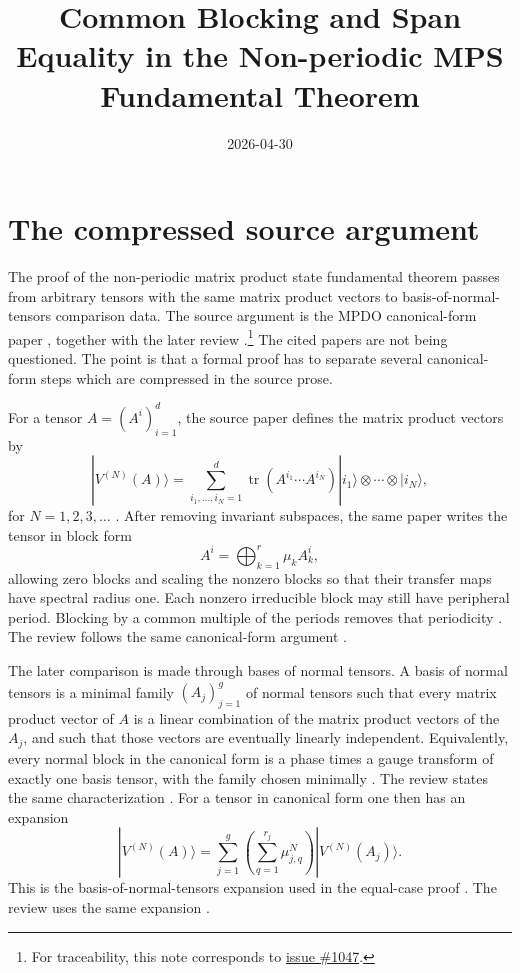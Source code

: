 \documentclass{article}
\title{Common Blocking and Span Equality in the Non-periodic MPS Fundamental Theorem}
\author{}
\date{2026-04-30}
\begin{document}
\maketitle

\section{The compressed source argument}

The proof of the non-periodic matrix product state fundamental theorem passes
from arbitrary tensors with the same matrix product vectors to
basis-of-normal-tensors comparison data. The source argument is the MPDO
canonical-form paper \cite{Cirac2016MPDO_arXiv,Cirac2017MPDO_AnnPhys}, together
with the later review \cite{Cirac2021Matrix}.\footnote{For traceability, this
note corresponds to \href{https://github.com/LionSR/TNLean/issues/1047}{issue \#1047}.}
The cited papers are not being questioned. The point is that a formal proof has
to separate several canonical-form steps which are compressed in the source
prose.

For a tensor $A=(A^i)_{i=1}^d$, the source paper defines the matrix product
vectors by
\[
  |V^{(N)}(A)\rangle
  = \sum_{i_1,\ldots,i_N=1}^d
      \operatorname{tr}(A^{i_1}\cdots A^{i_N})
      |i_1\rangle\otimes\cdots\otimes |i_N\rangle,
\]
for $N=1,2,3,\ldots$ \cite[definition of the matrix product vector family,
lines~130--138]{Cirac2016MPDO_arXiv}.
After removing invariant subspaces, the same paper writes the tensor in block form
\[
  A^i = \bigoplus_{k=1}^r \mu_k A_k^i,
\]
allowing zero blocks and scaling the nonzero blocks so that their transfer maps
have spectral radius one. Each nonzero irreducible block may still have peripheral
period. Blocking by a common multiple of the periods removes that periodicity
\cite[lines~214--231]{Cirac2016MPDO_arXiv}. The review follows the same
canonical-form argument \cite[lines~1798--1820]{Cirac2021Matrix}.

The later comparison is made through bases of normal tensors. A basis of normal
tensors is a minimal family $(A_j)_{j=1}^g$ of normal tensors such that every
matrix product vector of $A$ is a linear combination of the matrix product vectors
of the $A_j$, and such that those vectors are eventually linearly independent.
Equivalently, every normal block in the canonical form is a phase times a gauge
transform of exactly one basis tensor, with the family chosen minimally
\cite[Proposition~\texttt{prop:char-BNT}, lines~271--280]{Cirac2016MPDO_arXiv}.
The review states the same characterization
\cite[Proposition~\texttt{prop:char-BNT}, lines~1846--1859]{Cirac2021Matrix}.
For a tensor in canonical form one then has an expansion
\[
  |V^{(N)}(A)\rangle
    = \sum_{j=1}^g \left(\sum_{q=1}^{r_j} \mu_{j,q}^N\right)
        |V^{(N)}(A_j)\rangle.
\]
This is the basis-of-normal-tensors expansion used in the equal-case proof
\cite[lines~283--302]{Cirac2016MPDO_arXiv}. The review uses the same expansion
\cite[lines~1864--1885]{Cirac2021Matrix}.
\end{document}
